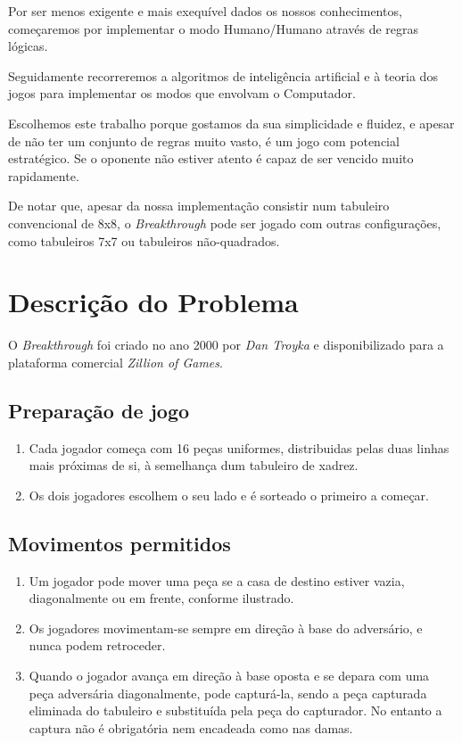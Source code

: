\documentclass[15pt,a4paper]{article}
\begin{document}
Por ser menos exigente e mais exequível dados os nossos conhecimentos, começaremos por implementar o modo Humano/Humano através de regras lógicas.

Seguidamente recorreremos a algoritmos de inteligência artificial e à teoria dos jogos para implementar os modos que envolvam o Computador.


Escolhemos este trabalho porque gostamos da sua simplicidade e fluidez, e apesar de não ter um conjunto de regras muito vasto, é um jogo com potencial estratégico. 
Se o oponente não estiver atento é capaz de ser vencido muito rapidamente.

De notar que, apesar da nossa implementação consistir num tabuleiro convencional de 8x8, o \textit{Breakthrough} pode ser jogado com outras configurações, como tabuleiros 7x7 ou tabuleiros não-quadrados.


\section{Descrição do Problema}


O \textit{Breakthrough} foi criado no ano 2000 por \textit{Dan Troyka}  e disponibilizado para a plataforma comercial \textit{Zillion of Games}.

\subsection{Preparação de jogo}
\begin{enumerate}
\item Cada jogador começa com 16 peças uniformes, distribuidas pelas duas linhas mais próximas de si, à semelhança dum tabuleiro de xadrez.
\item Os dois jogadores escolhem o seu lado e é sorteado o primeiro a começar.
\end{enumerate}

\subsection{Movimentos permitidos}
\begin{enumerate}
\item Um jogador pode mover uma peça se a casa de destino estiver vazia, diagonalmente ou em frente, conforme ilustrado.
\item Os jogadores movimentam-se sempre em direção à base do adversário, e nunca podem retroceder.
\item Quando o jogador avança em direção à base oposta e se depara com uma peça adversária diagonalmente, pode capturá-la, sendo a peça capturada eliminada do tabuleiro e substituída pela peça do capturador. 
No entanto a captura não é obrigatória nem encadeada como nas damas.
\end{enumerate}
\end{document}
